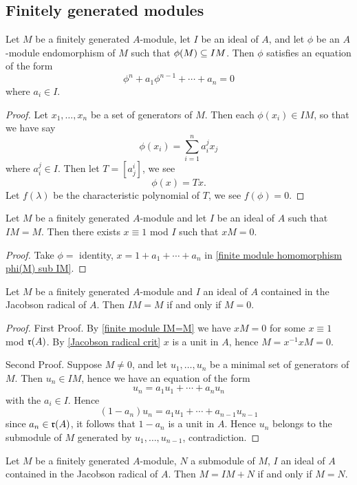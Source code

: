 \subsection{Finitely generated modules}
\begin{proposition}\label{finite module homomorphism phi(M) sub IM}
Let $M$ be a finitely generated $A$-module, let $I$ be an ideal of $A$, and let $\phi$ be an $A$-module endomorphism of $M$ such that $\phi(M)\subseteq IM$. Then $\phi$ satisfies an equation of the form
\[\phi^n+a_1\phi^{n-1}+\cdots+a_n=0\]
where $a_i\in I$.
\end{proposition}
\begin{proof}
Let $x_1,\dots,x_n$ be a set of generators of $M$. Then each $\phi(x_i)\in IM$, so that we have say
\[\phi(x_i)=\sum_{i=1}^na^j_ix_j\]
where $a^j_i\in I$. Then let $T=[a^i_j]$, we see
\[\phi (x)=Tx.\]
Let $f(\lambda)$ be the characteristic polynomial of $T$, we see $f(\phi)=0$.
\end{proof}
\begin{corollary}\label{finite module IM=M}
Let $M$ be a finitely generated $A$-module and let $I$ be an ideal of $A$ such that $IM=M$. Then there exists $x\equiv 1$ mod $I$ such that $xM=0$.
\end{corollary}
\begin{proof}
Take $\phi=$ identity, $x=1+a_1+\cdots+a_n$ in \cref{finite module homomorphism phi(M) sub IM}.
\end{proof}
\begin{proposition}\label{Nakayama lemma}
Let $M$ be a finitely generated $A$-module and $I$ an ideal of $A$ contained in the Jacobson radical of $A$. Then $IM=M$ if and only if $M=0$.
\end{proposition}
\begin{proof}
First Proof. By \cref{finite module IM=M} we have $xM=0$ for some $x\equiv 1$ mod $\mathfrak{r}(A)$. By \cref{Jacobson radical crit} $x$ is a unit in $A$, hence $M=x^{-1}xM=0$.\par
Second Proof. Suppose $M\neq0$, and let $u_1,\dots,u_n$ be a minimal set of generators of $M$. Then $u_n\in IM$, hence we have an equation of the form 
\[u_n=a_1u_1+\cdots+a_nu_n\]
with the $a_i\in I$. Hence
\[(1-a_n)u_n=a_1u_1+\cdots+a_{n-1}u_{n-1}\]
since $a_n\in \mathfrak{r}(A)$, it follows that $1-a_n$ is a unit in $A$. Hence $u_n$ belongs to the submodule of $M$ generated by $u_1,\dots,u_{n-1}$, contradiction.
\end{proof}
\begin{corollary}\label{finite module M=IM+N then M=N}
Let $M$ be a finitely generated $A$-module, $N$ a submodule of $M$, $I$ an ideal of $A$ contained in the Jacobson radical of $A$. Then $M=IM+N$ if and only if $M=N$.
\end{corollary}
